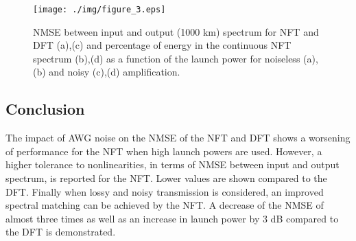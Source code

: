 \begin{figure}[htbp]
  \centering
   \texttt{[image: ./img/figure\_3.eps]}
   \caption{NMSE between input and output (1000 km) spectrum for \ac{NFT} and
   DFT (a),(c) and percentage of energy
in the continuous \ac{NFT} spectrum (b),(d) as a function of the launch power
for noiseless (a),(b) and noisy
(c),(d) amplification.}
  \label{fig:powersweep_with_noise}
\end{figure}

\subsection{Conclusion}
\linespread{1.2}
The impact of AWG noise on the NMSE of the \ac{NFT} and DFT shows a worsening of
performance for the \ac{NFT} when high launch powers are used. However, a higher
tolerance to nonlinearities, in terms of NMSE between input and output spectrum,
is reported for the \ac{NFT}. Lower values are shown compared to the DFT.
Finally when lossy and noisy transmission is considered, an improved spectral
matching can be achieved by the \ac{NFT}. A decrease of the NMSE of almost three
times as well as an increase in launch power by 3 dB compared to the DFT is
demonstrated.

